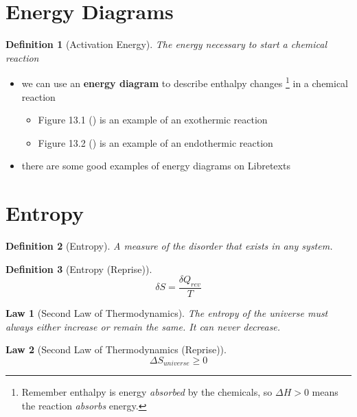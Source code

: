 \documentclass[11pt, oneside]{article}   	%
\newtheorem{definition}{Definition}
\newtheorem{law}{Law}
\begin{document}
\section{Energy Diagrams}

\begin{definition}[Activation Energy]\label{def:energy-activation}
The energy necessary to start a chemical reaction
\end{definition}

\begin{itemize}
\item we can use an \textbf{energy diagram} to describe enthalpy changes
\footnote{Remember enthalpy is energy \emph{absorbed} by the chemicals, so $\Delta H > 0$ means the reaction \emph{absorbs} energy.} 
in a chemical reaction
\begin{itemize}
\item Figure 13.1 (\cite[p. 436]{wile-chem-2}) is an example of an exothermic reaction
\item Figure 13.2 (\cite[p. 438]{wile-chem-2}) is an example of an endothermic reaction
\end{itemize}
\item there are some good examples of energy diagrams on Libretexts \cite{2019Energy}
\end{itemize}


\pagebreak
\section{Entropy}

\begin{definition}[Entropy]\label{def:entropy}
A measure of the disorder that exists in any system.
\end{definition}

\begin{definition}[Entropy (Reprise)]\label{def:entropy-reprise}
$$\delta S = \frac{\delta Q_{rev}}{T}$$
\end{definition}

\begin{law}[Second Law of Thermodynamics]\label{law:thermodynamics-second}
The entropy of the universe must always either increase or remain the same. It can never decrease.
\end{law}

\begin{law}[Second Law of Thermodynamics (Reprise)]\label{law:thermodynamics-second-reprise}
$$\Delta S_{universe} \ge 0$$
\end{law}
\end{document}
